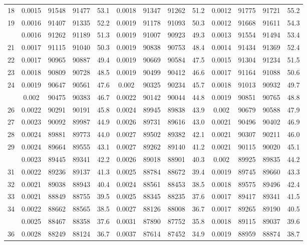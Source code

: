 \documentclass[
  14pt,
]{article}
\begin{document}
\begin{longtable}[t]{lcccccccccccc}
18 & 0.0015 & 91548 & 91477 & 53.1 & 0.0018 & 91347 & 91262 & 51.2 & 0.0012 & 91775 & 91721 & 55.2\\
19 & 0.0016 & 91407 & 91335 & 52.2 & 0.0019 & 91178 & 91093 & 50.3 & 0.0012 & 91668 & 91611 & 54.3\\
\addlinespace
20 & 0.0016 & 91262 & 91189 & 51.3 & 0.0019 & 91007 & 90923 & 49.3 & 0.0013 & 91554 & 91494 & 53.4\\
21 & 0.0017 & 91115 & 91040 & 50.3 & 0.0019 & 90838 & 90753 & 48.4 & 0.0014 & 91434 & 91369 & 52.4\\
22 & 0.0017 & 90965 & 90887 & 49.4 & 0.0019 & 90669 & 90584 & 47.5 & 0.0015 & 91304 & 91234 & 51.5\\
23 & 0.0018 & 90809 & 90728 & 48.5 & 0.0019 & 90499 & 90412 & 46.6 & 0.0017 & 91164 & 91088 & 50.6\\
24 & 0.0019 & 90647 & 90561 & 47.6 & 0.002 & 90325 & 90234 & 45.7 & 0.0018 & 91013 & 90932 & 49.7\\
\addlinespace
25 & 0.002 & 90475 & 90383 & 46.7 & 0.0022 & 90142 & 90044 & 44.8 & 0.0019 & 90851 & 90765 & 48.8\\
26 & 0.0022 & 90291 & 90191 & 45.8 & 0.0024 & 89945 & 89838 & 43.9 & 0.002 & 90679 & 90588 & 47.9\\
27 & 0.0023 & 90092 & 89987 & 44.9 & 0.0026 & 89731 & 89616 & 43.0 & 0.0021 & 90496 & 90402 & 46.9\\
28 & 0.0024 & 89881 & 89773 & 44.0 & 0.0027 & 89502 & 89382 & 42.1 & 0.0021 & 90307 & 90211 & 46.0\\
29 & 0.0024 & 89664 & 89555 & 43.1 & 0.0027 & 89262 & 89140 & 41.2 & 0.0021 & 90115 & 90020 & 45.1\\
\addlinespace
30 & 0.0023 & 89445 & 89341 & 42.2 & 0.0026 & 89018 & 88901 & 40.3 & 0.002 & 89925 & 89835 & 44.2\\
31 & 0.0022 & 89236 & 89137 & 41.3 & 0.0025 & 88784 & 88672 & 39.4 & 0.0019 & 89745 & 89660 & 43.3\\
32 & 0.0021 & 89038 & 88943 & 40.4 & 0.0024 & 88561 & 88453 & 38.5 & 0.0018 & 89575 & 89496 & 42.4\\
33 & 0.0021 & 88849 & 88755 & 39.5 & 0.0025 & 88345 & 88235 & 37.6 & 0.0017 & 89417 & 89341 & 41.5\\
34 & 0.0022 & 88662 & 88565 & 38.5 & 0.0027 & 88126 & 88008 & 36.7 & 0.0017 & 89265 & 89190 & 40.5\\
\addlinespace
35 & 0.0025 & 88467 & 88358 & 37.6 & 0.0031 & 87890 & 87752 & 35.8 & 0.0018 & 89115 & 89037 & 39.6\\
36 & 0.0028 & 88249 & 88124 & 36.7 & 0.0037 & 87614 & 87452 & 34.9 & 0.0019 & 88959 & 88874 & 38.7\\

\end{longtable}
\end{document}
